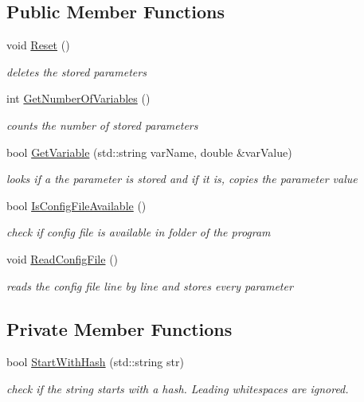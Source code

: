 \subsection*{Public Member Functions}
\begin{DoxyCompactItemize}
\item 
\mbox{\label{classConfigFile_ab958517fc07a5075b4663e0e46efaed6}} 
void \hyperlink{classConfigFile_ab958517fc07a5075b4663e0e46efaed6}{Reset} ()
\begin{DoxyCompactList}\small\item\em deletes the stored parameters \end{DoxyCompactList}\item 
int \hyperlink{classConfigFile_a6dedab9ccb1548b6a0910cee953c0b49}{Get\+Number\+Of\+Variables} ()
\begin{DoxyCompactList}\small\item\em counts the number of stored parameters \end{DoxyCompactList}\item 
bool \hyperlink{classConfigFile_a4395577037347f2af515aaeeded9e727}{Get\+Variable} (std\+::string var\+Name, double \&var\+Value)
\begin{DoxyCompactList}\small\item\em looks if a the parameter is stored and if it is, copies the parameter value \end{DoxyCompactList}\item 
bool \hyperlink{classConfigFile_aa8874c0773572d6853b09414f16472bb}{Is\+Config\+File\+Available} ()
\begin{DoxyCompactList}\small\item\em check if config file is available in folder of the program \end{DoxyCompactList}\item 
\mbox{\label{classConfigFile_a60c3135e4354d8f450679130359f5098}} 
void \hyperlink{classConfigFile_a60c3135e4354d8f450679130359f5098}{Read\+Config\+File} ()
\begin{DoxyCompactList}\small\item\em reads the config file line by line and stores every parameter \end{DoxyCompactList}\end{DoxyCompactItemize}
\subsection*{Private Member Functions}
\begin{DoxyCompactItemize}
\item 
bool \hyperlink{classConfigFile_a3be9deb6d7f24b7cff36d5746226a440}{Start\+With\+Hash} (std\+::string str)
\begin{DoxyCompactList}\small\item\em check if the string starts with a hash. Leading whitespaces are ignored. \end{DoxyCompactList}\end{DoxyCompactItemize}
